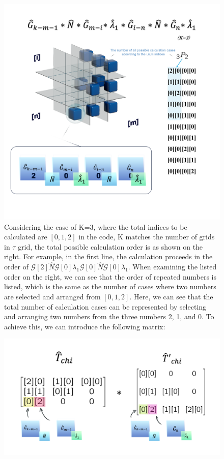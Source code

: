 \documentclass{article}[12pt]
\numberwithin{equation}{section}
\begin{document}
\begin{spacing}{1.5}
\begin{figure}[p]
  \centerline{\includegraphics[width=14cm]{TexFigure/3_Tmat.png}}
  \caption{Considering the case of K=3, where the total indices to be calculated are $[0, 1, 2]$ in the code, K matches the number of grids in $\tau$ grid, the total possible calculation order is as shown on the right. 
  For example, in the first line, the calculation proceeds in the order of $\mathcal{G}[2]\hat{N}\mathcal{G}[0]\lambda_1\mathcal{G}[0]\hat{N}\mathcal{G}[0]\lambda_1$. 
  When examining the listed order on the right, we can see that the order of repeated numbers is listed, 
  which is the same as the number of cases where two numbers are selected and arranged from $[0, 1, 2]$.
  Here, we can see that the total number of calculation cases can be represented by selecting and arranging two numbers from the three numbers 2, 1, and 0. To achieve this, we can introduce the following matrix:
}
\end{figure}
\pagebreak
\begin{figure}[H]
  \centerline{\includegraphics[width=12cm]{TexFigure/Tmat2.png}}

\end{figure}
\end{spacing}
\end{document}
